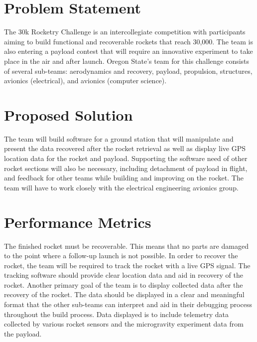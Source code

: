 \documentclass[onecolumn, draftclsnofoot,10pt, compsoc]{IEEEtran}
\begin{document}
\section{Problem Statement}
The 30k Rocketry Challenge is an intercollegiate competition with participants aiming to build functional and recoverable rockets that reach 30,000.
The team is also entering a payload contest that will require an innovative experiment to take place in the air and after launch.
Oregon State’s team for this challenge consists of several sub-teams: aerodynamics and recovery, payload, propulsion, structures, avionics (electrical), and avionics (computer science).

\section{Proposed Solution}
The team will build software for a ground station that will manipulate and present the data recovered after the rocket retrieval as well as display live GPS location data for the rocket and payload.
Supporting the software need of other rocket sections will also be necessary, including detachment of payload in flight, and feedback for other teams while building and improving on the rocket.
The team will have to work closely with the electrical engineering avionics group.

\section{Performance Metrics}
The finished rocket must be recoverable.
This means that no parts are damaged to the point where a follow-up launch is not possible.
In order to recover the rocket, the team will be required to track the rocket with a live GPS signal.
The tracking software should provide clear location data and aid in recovery of the rocket.
Another primary goal of the team is to display collected data after the recovery of the rocket.
The data should be displayed in a clear and meaningful format that the other sub-teams can interpret and aid in their debugging process throughout the build process.
Data displayed is to include telemetry data collected by various rocket sensors and the microgravity experiment data from the payload.
\end{document}
